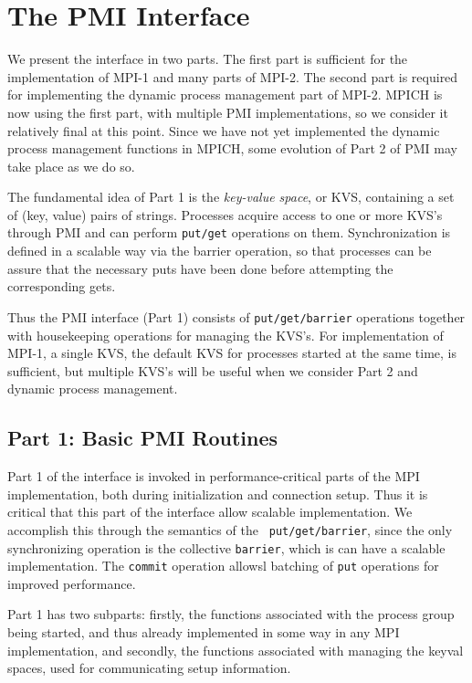 \documentclass[11pt]{article}
\begin{document}
\section{The PMI Interface}
\label{sec:interface}

We present the interface in two parts.  The first part is sufficient for
the implementation of MPI-1 and many parts of MPI-2.  The second part is
required for implementing the dynamic process management part of MPI-2.
MPICH is now using the first part, with multiple PMI implementations,
so we consider it relatively final at this point.  Since we have not yet
implemented the dynamic process management functions in MPICH, some
evolution of Part 2 of PMI may take place as we do so.

The fundamental idea of Part 1 is the {\em key-value space}, or KVS,
containing a set of (key, value) pairs of strings.  Processes acquire 
access to one or more KVS's through PMI and can perform {\tt put/get}
operations on them.  Synchronization is defined in a scalable way via
the barrier operation, so that processes can be assure that the necessary
puts have been done before attempting the corresponding gets.

Thus the PMI interface (Part 1) consists of {\tt put/get/barrier} operations
together with housekeeping operations for managing the KVS's.  For
implementation of MPI-1, a single KVS, the default KVS for processes
started at the same time, is sufficient, but multiple KVS's will be
useful when we consider Part 2 and dynamic process management.


\subsection{Part 1:  Basic PMI Routines}
\label{sec:part1}

Part 1 of the interface is invoked in performance-critical parts of the
MPI implementation, both during initialization and connection setup.
Thus it is critical that this part of the interface allow scalable
implementation.  We accomplish this through the semantics of the {\tt
  put/get/barrier}, since the only synchronizing operation is the
collective {\tt barrier}, which is can have a scalable implementation.
The {\tt commit} operation allowsl batching of {\tt put} operations for
improved performance.

Part 1 has two subparts:  firstly, the functions associated with the process group
being started, and thus already implemented in some way in any MPI
implementation, and secondly, the functions associated with managing the
keyval spaces, used for communicating setup information. 
\end{document}
